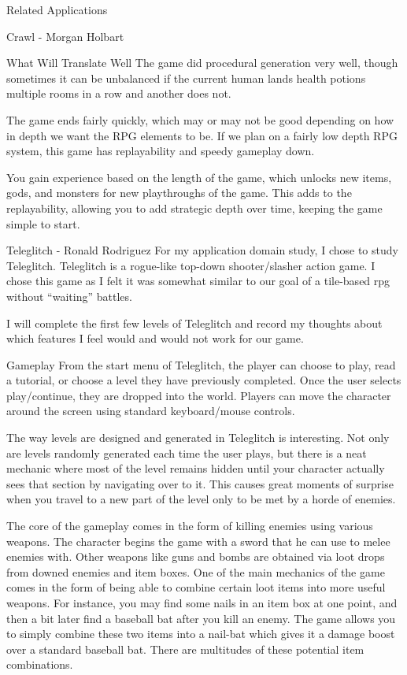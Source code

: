 \documentclass[12pt]{report}
\begin{document}
\begin{section}{Related Applications}
\begin{subsection}{Crawl - Morgan Holbart}
\begin{subsubsection}{What Will Translate Well}
The game did procedural generation very well, though sometimes it can be
unbalanced if the current human lands health potions multiple rooms in a
row and another does not.

The game ends fairly quickly, which may or may not be good depending on how
in depth we want the RPG elements to be. If we plan on a fairly low depth
RPG system, this game has replayability and speedy gameplay down.

You gain experience based on the length of the game, which
unlocks new items, gods, and monsters for new playthroughs of the  game.
This adds to the
replayability, allowing you to add strategic depth over time, keeping the
game simple to start.
\end{subsubsection}
\end{subsection}

\begin{subsection}{Teleglitch - Ronald Rodriguez}
For my application domain study, I chose to study Teleglitch. Teleglitch 
is a rogue-like top-down shooter/slasher action game. I chose this game 
as I felt it was somewhat similar to our goal of a tile-based rpg without 
``waiting'' battles.

I will complete the first few levels of Teleglitch and record my thoughts 
about which features I feel would and would not work for our 
game. 

\begin{subsubsection}{Gameplay}
From the start menu of Teleglitch, the player can choose to play, read a 
tutorial, or choose a level they have previously completed. Once the 
user selects play/continue, they are dropped into the world. Players can
move  the character around the screen using standard keyboard/mouse
controls. 

The way levels are designed and generated in Teleglitch is interesting. Not
only are levels randomly generated each time the user plays, but there is a
neat mechanic where most of the level remains hidden until your character 
actually sees that section by navigating over to it. This causes great 
moments of surprise when you travel to a new part of the level only to be 
met by a horde of enemies. 

The core of the gameplay comes in the form of killing enemies using various
weapons. The character begins the game with a sword that he can use to
melee  enemies with. Other weapons like guns and bombs are obtained via
loot drops from downed enemies and item boxes. One of the main mechanics of
the game comes in the form of being able to combine certain loot items into
more useful weapons. For instance, you may find some nails in an item box
at one point, and then a bit later find a baseball bat after you kill an
enemy. The game allows you to simply combine these two items into a
nail-bat which gives it a damage boost over a standard baseball bat. There
are multitudes of these potential item combinations. 


\end{subsubsection}
\end{subsection}
\end{section}
\end{document}
